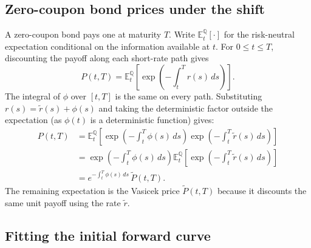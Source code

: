 \documentclass[11pt,a4paper]{article}
\begin{document}
\subsection{Zero-coupon bond prices under the shift}\label{subsec:3c}

A zero-coupon bond pays one at maturity $T$. Write $\mathbb{E}^{\mathbb{Q}}_t[\cdot]$ for the risk-neutral expectation conditional on the information available at $t$. For $0\leq t\leq T$, discounting the payoff along each short-rate path gives
\[
P(t,T)=\mathbb{E}^{\mathbb{Q}}_t\!\left[
         \exp\!\left(-\int_t^T r(s)\,ds\right)\right].
\]
The integral of $\phi$ over $[t,T]$ is the same on every path. Substituting $r(s)=\tilde r(s)+\phi(s)$ and taking the deterministic factor outside the expectation (as $\phi(t)$ is a deterministic function) gives:
\begin{align*}
P(t,T)
  &=\mathbb{E}^{\mathbb{Q}}_t\!\left[
       \exp\!\left(-\int_t^T\phi(s)\,ds\right)
       \exp\!\left(-\int_t^T\tilde r(s)\,ds\right)\right] \\
  &=\exp\!\left(-\int_t^T\phi(s)\,ds\right)
       \mathbb{E}^{\mathbb{Q}}_t\!\left[
       \exp\!\left(-\int_t^T\tilde r(s)\,ds\right)\right] \\
  &=e^{-\int_t^T\phi(s)\,ds}\,\tilde P(t,T).
\end{align*}
The remaining expectation is the Vasicek price $\tilde P(t,T)$ because it discounts the same unit payoff using the rate $\tilde r$.

\subsection{Fitting the initial forward curve}\label{subsec:3d}
\end{document}
